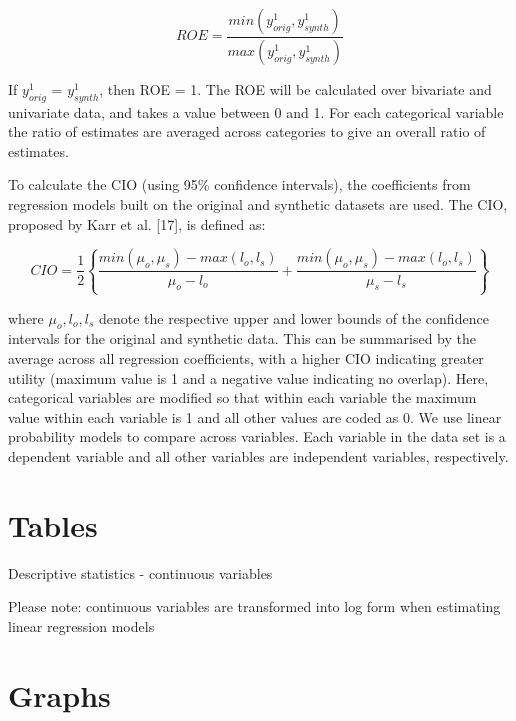 \documentclass[12pt]{article}
\begin{document}
\begin{equation}
    ROE = \frac{min(y^1_{orig},y^1_{synth})}{max(y^1_{orig},y^1_{synth})}
\end{equation}

If $y^1_{orig}$ = $y^1_{synth}$, then ROE = 1.  The ROE will be calculated over bivariate and univariate data, and takes a value between 0 and 1. For each categorical variable the ratio of estimates are averaged across categories to give an overall ratio of estimates.

To calculate the CIO (using 95\% confidence intervals), the coefficients from regression models built on the original and synthetic datasets are used. The CIO, proposed by Karr et al. [17], is defined as:

\begin{equation}
    CIO = \frac{1}{2}\left\{\frac{min(\mu_o,\mu_s)-max(l_o,l_s)}{\mu_o - l_o} + \frac{min(\mu_o,\mu_s)-max(l_o,l_s)}{\mu_s - l_s}\right\}
\end{equation}

where $\mu_o, l_o, l_s$ denote the respective upper and lower bounds of the confidence intervals for the original and synthetic data. This can be summarised by the average across all regression coefficients, with a higher CIO indicating greater utility (maximum value is 1 and a negative value indicating no overlap).  Here, categorical variables are modified so that within each variable the maximum value within each variable is 1 and all other values are coded as 0.  We use linear probability models to compare across variables.  Each variable in the data set is a dependent variable and all other variables are independent variables, respectively.

\section{Tables}
\begin{table}[!h]
    \caption{Descriptive statistics - continuous variables}
    \centering
    \resizebox{\textwidth}{!}{}
    \label{table_variables_continuous}
\end{table}

Please note: continuous variables are transformed into log form when estimating linear regression models 

\clearpage
\section{Graphs}
\end{document}
